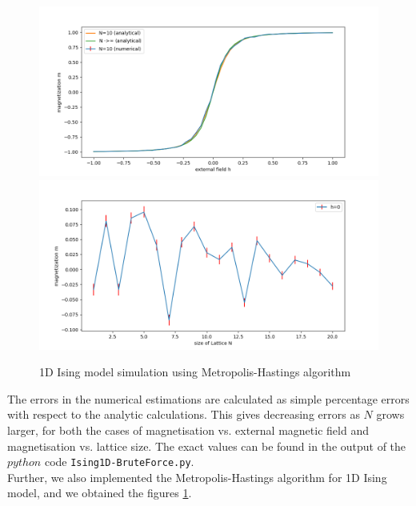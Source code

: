 \documentclass{article}
\begin{document}
\begin{enumerate}
\begin{figure}[h!]
    \includegraphics[width=.45\textwidth]{num_vs_anal_N10.png}\hfill
    \includegraphics[width=.45\textwidth]{h_0_10000samples.png}\hfill
    \caption{1D Ising model simulation using Metropolis-Hastings algorithm}
    \label{fig:metropolishastings}
\end{figure}
    The errors in the numerical estimations are calculated as simple percentage errors with respect to the analytic calculations. This gives decreasing errors as $N$ grows larger, for both the cases of magnetisation vs. external magnetic field and magnetisation vs. lattice size. The exact values can be found in the output of the $python$ code \verb|Ising1D-BruteForce.py|.\\
    Further, we also implemented the Metropolis-Hastings algorithm for 1D Ising model, and we obtained the figures \ref{fig:metropolishastings}.
\end{enumerate}
\end{document}
